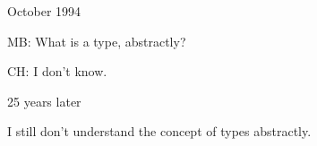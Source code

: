 














\begin{frame}
\titlepage
\end{frame}

\begin{frame}{October 1994}

  \pause
  MB: What is a type, abstractly? 


  \VSPACE\pause
  CH: I don't know.
\end{frame}


\begin{frame}{25 years later}

    I still  don't understand the concept of types abstractly.

\end{frame}

